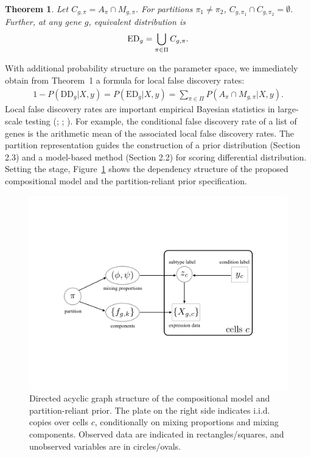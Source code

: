 \documentclass[aoas,preprint]{imsart}
\newtheorem{theorem}{Theorem}
\begin{document}
\begin{theorem}  Let $C_{g,\pi} = A_\pi\cap M_{g, \pi}$.  For 
partitions $\pi_1 \neq\pi_2$, \mbox{$C_{g,\pi_1} \cap C_{g,\pi_2} = \emptyset$}. Further,
 at any gene $g$, equivalent distribution is
\begin{eqnarray*}
{\rm{ED}}_g = \bigcup_{\pi \in \Pi} C_{g,\pi}.
\end{eqnarray*}
\end{theorem}
With additional 
probability structure on the parameter space,  we immediately obtain from Theorem~1 
a formula for local false discovery rates:
\begin{align}
\label{eq:lfdr}
1-P(\text{DD}_g|X,y) = 
 P(\text{ED}_g|X,y) = \sum_{\pi \in \Pi} P\left(A_\pi \cap M_{g,\pi} |X,y \right).
\end{align}
Local false discovery rates are important empirical Bayesian 
statistics in large-scale testing (\cite{Efron:2007aa}; \cite{Muralidharan:2010aa}; \cite{Newton:2004aa}).  
For example, the conditional false discovery rate of a list of genes 
is the arithmetic mean of the associated local false discovery rates.  
The partition representation guides the construction of a prior distribution (Section 2.3) and a 
model-based method (Section 2.2) for scoring  differential distribution.   Setting the stage, 
Figure~\ref{fig:dag} shows the dependency structure of 
the proposed compositional model and the partition-reliant prior specification.

\begin{figure}[h!]
\includegraphics[trim={4cm 6cm 4cm 6cm}, clip, width=5in]{Figs/dag.png}
  \caption{Directed acyclic graph structure of the compositional 
model and partition-reliant prior. The plate on the right side indicates i.i.d.
copies over cells $c$, conditionally on mixing proportions and mixing components.
 Observed data are indicated in rectangles/squares, and unobserved variables
are in circles/ovals. }
  \label{fig:dag}
\end{figure}
\end{document}

